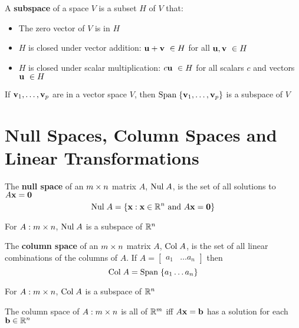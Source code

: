 \documentclass{report}
\begin{document}
\begin{definition}
    A \textbf{subspace} of a space $V$ is a subset $H$ of $V$ that:
    \begin{itemize}
        \item The zero vector of $V$ is in $H$
        \item $H$ is closed under vector addition: $\uu + \vv \ \in H$ for all $\mathbf{u}, \mathbf{v} \ \in H$
        \item $H$ is closed under scalar multiplication: $c\uu \ \in H$ for all scalars $c$ and vectors $\mathbf{u}\ \in H$
    \end{itemize}
\end{definition}

\begin{theorem}
    If $\mathbf{v}_1, \ldots, \mathbf{v}_p$ are in a vector space $V$, then $\mathrm{Span}\; \{\mathbf{v}_1, \ldots, \mathbf{v}_p\}$ is a subspace of $V$
\end{theorem}

\section{Null Spaces, Column Spaces and Linear Transformations}

\begin{definition}
    The \textbf{null space} of an $m \times n$ matrix $A$, $\mathrm{Nul}\; A$, is the set of all solutions to $A\mathbf{x} = \mathbf{0}$
    \[\mathrm{Nul}\; A = \{\mathbf{x} : \mathbf{x} \in \mathbb{R}^n \text{ and } A \mathbf{x} = \mathbf{0}\}\]
\end{definition}

\begin{theorem}
    For $A: m \times n$, $\mathrm{Nul}\; A$ is a subspace of $\mathbb{R}^n$
\end{theorem}

\begin{definition}
    The \textbf{column space} of an $m \times n$ matrix $A$, $\mathrm{Col}\; A$, is the
    set of all linear combinations of the columns of $A$. If $A = \begin{bmatrix}
        a_1 & \dots a_n
    \end{bmatrix}$ then \[
    \mathrm{Col}\; A = \mathrm{Span}\; \{a_1 \ldots a_n\}
    \]
\end{definition}

\begin{theorem}
    For $A: m \times n$, $\mathrm{Col}\; A$ is a subspace of $\mathbb{R}^n$
\end{theorem}

The column space of $A: m \times n$ is all of $\mathbb{R}^m$ iff $A\mathbf{x}=\mathbf{b}$ has a solution for each $\mathbf{b} \in \mathbb{R}^n$
\end{document}
